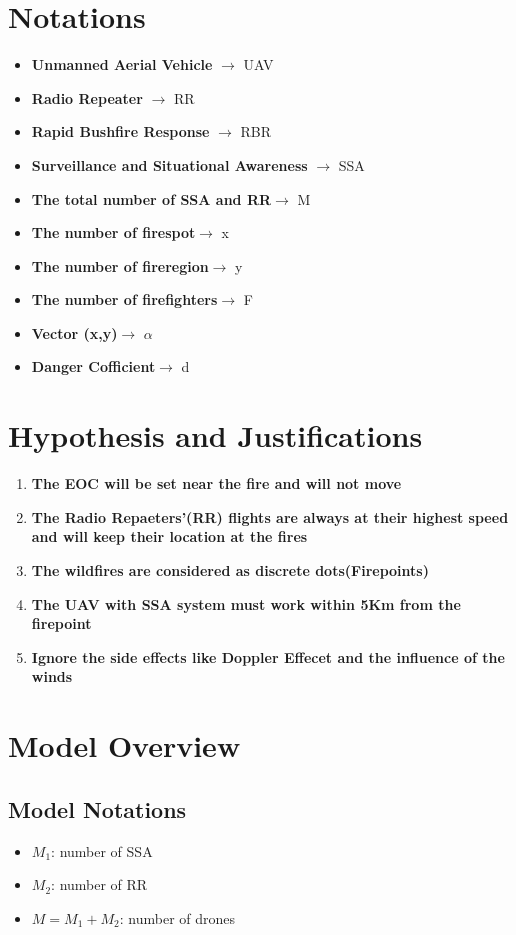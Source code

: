\documentclass{mcmthesis}
\begin{document}
\section{Notations}
\begin{itemize}
  \item \textbf{Unmanned Aerial Vehicle} $\rightarrow$ UAV
  \item \textbf{Radio Repeater} $\rightarrow$ RR
  \item \textbf{Rapid Bushfire Response} $\rightarrow$ RBR
  \item \textbf{Surveillance and Situational Awareness} $\rightarrow$ SSA
  \item \textbf{The total number of SSA and RR}$\rightarrow$ M
  \item \textbf{The number of firespot}$\rightarrow$ x
  \item \textbf{The number of fireregion}$\rightarrow$ y
  \item \textbf{The number of firefighters}$\rightarrow$ F
  \item \textbf{Vector (x,y)}$\rightarrow$ $\alpha$ 
  \item \textbf{Danger Cofficient}$\rightarrow$ d
\end{itemize}
\newpage


\section{Hypothesis and Justifications}
\begin{enumerate}
  \item \textbf{The EOC will be set near the fire and will not move}
  \item \textbf{The Radio Repaeters'(RR) flights are always at their highest speed and will keep their location at the fires}
  \item \textbf{The wildfires are considered as discrete dots(Firepoints)} 
  \item \textbf{The UAV with SSA system must work within 5Km from the firepoint}
  \item \textbf{Ignore the side effects like Doppler Effecet and the influence of the winds}
\end{enumerate}

\section{Model Overview}
\subsection{Model Notations}
\begin{itemize}
  \item $M_1$: number of SSA
  \item $M_2$: number of RR
  \item $M=M_1+M_2$: number of drones
\end{itemize}
\end{document}
